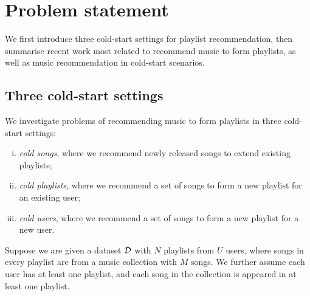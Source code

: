 \section{Problem statement}
\label{sec:problem}

We first introduce three cold-start settings for playlist recommendation, 
then summarise recent work most related to recommend music to form playlists,
as well as music recommendation in cold-start scenarios.



\subsection{Three cold-start settings}

We investigate problems of recommending music to form playlists in three cold-start settings:
\begin{enumerate}[(i)]
\item \emph{cold songs}, where we recommend newly released songs to extend existing playlists;
\item \emph{cold playlists}, where we recommend a set of songs to form a new playlist for an existing user;
\item \emph{cold users}, where we recommend a set of songs to form a new playlist for a new user.
\end{enumerate}


Suppose we are given a dataset $\mathcal{D}$ with $N$ playlists from $U$ users, 
where songs in every playlist are from a music collection with $M$ songs.
We further assume each user has at least one playlist, and each song in the collection 
is appeared in at least one playlist.

